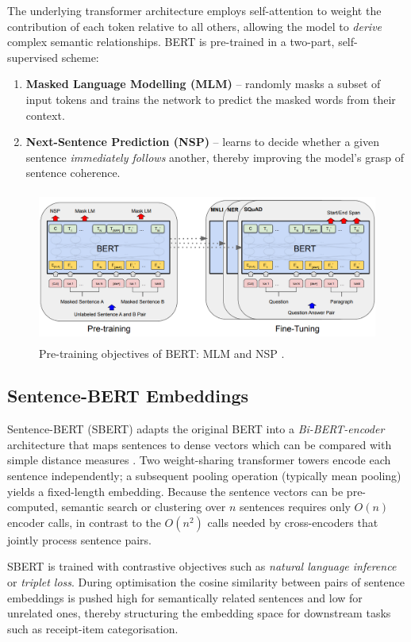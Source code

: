 \documentclass{SGGW-thesis-EN}
\begin{document}
The underlying transformer architecture employs self-attention to weight the contribution of each token relative to all others, allowing 
the model to \emph{derive} complex semantic relationships.
BERT is pre-trained in a two-part, self-supervised scheme:
\begin{enumerate}
  \item \textbf{Masked Language Modelling (MLM)} – randomly masks a subset of input tokens and trains the network to predict the 
        masked words from their context.
  \item \textbf{Next-Sentence Prediction (NSP)} – learns to decide whether a given sentence \emph{immediately follows} another, 
        thereby improving the model’s grasp of sentence coherence.
\end{enumerate}

\begin{figure}[h]
  \centering
  \includegraphics[height=5cm]{images/bert_procedures.png}
  \caption{Pre-training objectives of BERT: MLM and NSP \cite{devlin2019bertpretrainingdeepbidirectional}.}
  \label{fig:bert_procedures}
\end{figure}

\subsection{Sentence-BERT Embeddings}
Sentence-BERT (SBERT) adapts the original BERT into a \emph{Bi-BERT-encoder} architecture that
maps sentences to dense vectors which can be compared with simple distance measures
\cite{reimers2019sbert}.
Two weight-sharing transformer towers encode each sentence independently; a subsequent pooling
operation (typically mean pooling) yields a fixed-length embedding.
Because the sentence vectors can be pre-computed, semantic search or clustering over \(n\)
sentences requires only \(O(n)\) encoder calls, in contrast to the \(O(n^{2})\) calls needed by
cross-encoders that jointly process sentence pairs.

SBERT is trained with contrastive objectives such as \emph{natural language inference} or
\emph{triplet loss}.
During optimisation the cosine similarity between pairs of sentence embeddings is pushed high
for semantically related sentences and low for unrelated ones, thereby structuring the
embedding space for downstream tasks such as receipt-item categorisation.
\end{document}
